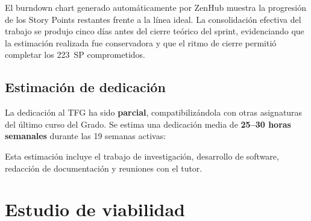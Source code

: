 El burndown chart generado automáticamente por ZenHub muestra la progresión de los Story Points restantes frente a la línea ideal. La consolidación efectiva del trabajo se produjo cinco días antes del cierre teórico del sprint, evidenciando que la estimación realizada fue conservadora y que el ritmo de cierre permitió completar los 223~SP comprometidos.



\subsection{Estimación de dedicación}

La dedicación al TFG ha sido \textbf{parcial}, compatibilizándola con otras asignaturas del último curso del Grado. Se estima una dedicación media de \textbf{25--30 horas semanales} durante las 19 semanas activas:


Esta estimación incluye el trabajo de investigación, desarrollo de software, redacción de documentación y reuniones con el tutor.

\section{Estudio de viabilidad}

